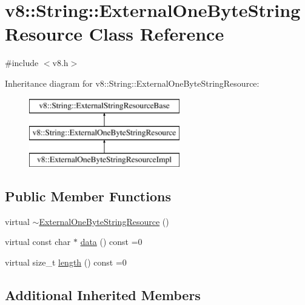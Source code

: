 \hypertarget{classv8_1_1_string_1_1_external_one_byte_string_resource}{}\section{v8\+:\+:String\+:\+:External\+One\+Byte\+String\+Resource Class Reference}
\label{classv8_1_1_string_1_1_external_one_byte_string_resource}


{\ttfamily \#include $<$v8.\+h$>$}

Inheritance diagram for v8\+:\+:String\+:\+:External\+One\+Byte\+String\+Resource\+:\begin{figure}[H]
\begin{center}
\leavevmode
\includegraphics[height=3.000000cm]{classv8_1_1_string_1_1_external_one_byte_string_resource}
\end{center}
\end{figure}
\subsection*{Public Member Functions}
\begin{DoxyCompactItemize}
\item 
virtual \hyperlink{classv8_1_1_string_1_1_external_one_byte_string_resource_a443edbb33926b2a9480fe0caac6e95ab}{$\sim$\+External\+One\+Byte\+String\+Resource} ()
\item 
virtual const char $\ast$ \hyperlink{classv8_1_1_string_1_1_external_one_byte_string_resource_ac6183fe16dcb0d6f2906f7caf7ff1163}{data} () const  =0
\item 
virtual size\+\_\+t \hyperlink{classv8_1_1_string_1_1_external_one_byte_string_resource_aa1db65afab54efe13daf6bd39f2ad265}{length} () const  =0
\end{DoxyCompactItemize}
\subsection*{Additional Inherited Members}


